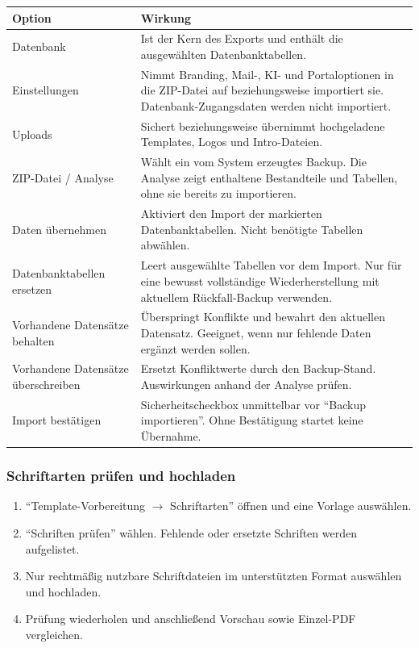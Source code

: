 \documentclass[12pt,a4paper]{article}
\begin{document}
\begin{tabularx}{\textwidth}{|p{}|X|}
\hline
\textbf{Option} & \textbf{Wirkung}\\
\hline
Datenbank & Ist der Kern des Exports und enthält die ausgewählten Datenbanktabellen.\\
\hline
Einstellungen & Nimmt Branding, Mail-, KI- und Portaloptionen in die ZIP-Datei auf beziehungsweise importiert sie. Datenbank-Zugangsdaten werden nicht importiert.\\
\hline
Uploads & Sichert beziehungsweise übernimmt hochgeladene Templates, Logos und Intro-Dateien.\\
\hline
ZIP-Datei / Analyse & Wählt ein vom System erzeugtes Backup. Die Analyse zeigt enthaltene Bestandteile und Tabellen, ohne sie bereits zu importieren.\\
\hline
Daten übernehmen & Aktiviert den Import der markierten Datenbanktabellen. Nicht benötigte Tabellen abwählen.\\
\hline
Datenbanktabellen ersetzen & Leert ausgewählte Tabellen vor dem Import. Nur für eine bewusst vollständige Wiederherstellung mit aktuellem Rückfall-Backup verwenden.\\
\hline
Vorhandene Datensätze behalten & Überspringt Konflikte und bewahrt den aktuellen Datensatz. Geeignet, wenn nur fehlende Daten ergänzt werden sollen.\\
\hline
Vorhandene Datensätze überschreiben & Ersetzt Konfliktwerte durch den Backup-Stand. Auswirkungen anhand der Analyse prüfen.\\
\hline
Import bestätigen & Sicherheitscheckbox unmittelbar vor \enquote{Backup importieren}. Ohne Bestätigung startet keine Übernahme.\\
\hline
\end{tabularx}

\subsubsection{Schriftarten prüfen und hochladen}
\begin{enumerate}
  \item \enquote{Template-Vorbereitung \(\rightarrow\) Schriftarten} öffnen und eine Vorlage auswählen.
  \item \enquote{Schriften prüfen} wählen. Fehlende oder ersetzte Schriften werden aufgelistet.
  \item Nur rechtmäßig nutzbare Schriftdateien im unterstützten Format auswählen und hochladen.
  \item Prüfung wiederholen und anschließend Vorschau sowie Einzel-PDF vergleichen.
\end{enumerate}
\end{document}

